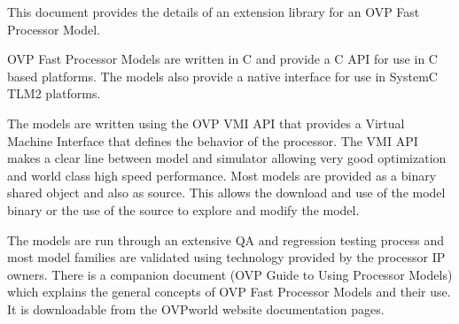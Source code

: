 %
%
%
%
%
This document provides the details of an extension library for an OVP Fast Processor Model.
\par
OVP Fast Processor Models are written in C and provide a C API for use in C based
platforms. The models also provide a native interface for use in SystemC TLM2 platforms.
\par
The models are written using the OVP VMI API that provides a Virtual Machine Interface that defines the behavior of the processor.
The VMI API makes a clear line between model and simulator allowing very good optimization and world class high speed performance.
Most models are provided as a binary shared object and also as source.
This allows the download and use of the model binary or the use of the source to explore and modify the model.
\par
The models are run through an extensive QA and regression testing process and most model families are validated using technology provided by the processor IP owners.
There is a companion document (OVP Guide to Using Processor Models) which explains the general concepts of OVP Fast Processor Models and their use.
It is downloadable from the OVPworld website documentation pages.
\par
\setlength{\parindent}{0pt}

